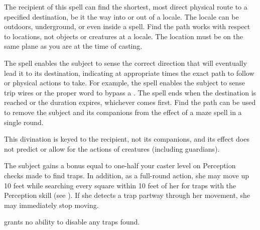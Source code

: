 \begin{spelleffect}
The recipient of this spell can find the shortest, most direct physical route to a specified destination, be it the way into or out of a locale. The locale can be outdoors, underground, or even inside a  spell. Find the path works with respect to locations, not objects or creatures at a locale. The location must be on the same plane as you are at the time of casting.
\par The spell enables the subject to sense the correct direction that will eventually lead it to its destination, indicating at appropriate times the exact path to follow or physical actions to take. For example, the spell enables the subject to sense trip wires or the proper word to bypass a . The spell ends when the destination is reached or the duration expires, whichever comes first. Find the path can be used to remove the subject and its companions from the effect of a maze spell in a single round.
\end{spelleffect}
\begin{spellnotes}
This divination is keyed to the recipient, not its companions, and its effect does not predict or allow for the actions of creatures (including guardians).
\end{spellnotes}

\spelldur{\durmed}
\begin{spelleffect}
    The subject gains a bonus equal to one-half your caster level on Perception checks made to find traps. In addition, as a full-round action, she may move up 10 feet while searching every square within 10 feet of her for traps with the Perception skill (see ). If she detects a trap partway through her movement, she may immediately stop moving.
\end{spelleffect}
\begin{spellnotes}
 grants no ability to disable any traps found.
\end{spellnotes}


